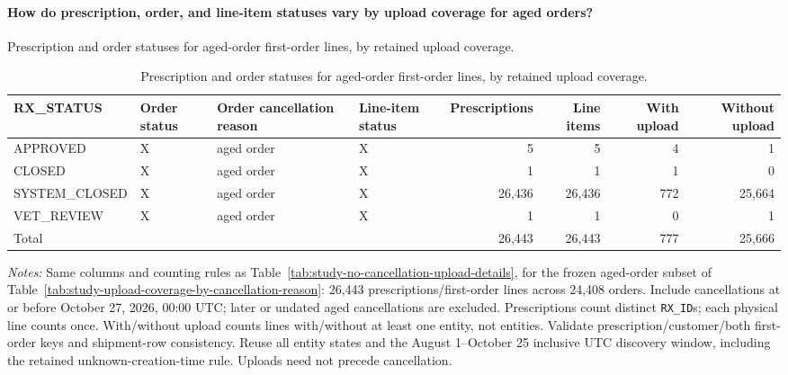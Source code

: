 \begin{landscape}
\paragraph{How do prescription, order, and line-item statuses vary by upload coverage for aged orders?}
Prescription and order statuses for aged-order first-order lines, by retained upload coverage.

\begin{table}[!htbp]
\centering
\caption{Prescription and order statuses for aged-order first-order lines, by retained upload coverage.}
\label{tab:study-aged-order-upload-coverage}
\small
\setlength{\tabcolsep}{6pt}
\begin{tabular}{llllrrrr}
\toprule
RX\_STATUS & Order status & Order cancellation reason & Line-item status & Prescriptions & Line items & With upload & Without upload \\
\midrule
\rowcolor{yellow!35}
APPROVED & X & aged order & X & 5 & 5 & 4 & 1 \\
\rowcolor{yellow!35}
CLOSED & X & aged order & X & 1 & 1 & 1 & 0 \\
\rowcolor{yellow!35}
SYSTEM\_CLOSED & X & aged order & X & 26,436 & 26,436 & 772 & 25,664 \\
\rowcolor{yellow!35}
VET\_REVIEW & X & aged order & X & 1 & 1 & 0 & 1 \\
\midrule
\multicolumn{4}{l}{Total} & 26,443 & 26,443 & 777 & 25,666 \\
\bottomrule
\end{tabular}
\begin{minipage}{\linewidth}
\footnotesize
\textit{Notes:} Same columns and counting rules as Table~\ref{tab:study-no-cancellation-upload-details},
for the frozen aged-order subset of Table~\ref{tab:study-upload-coverage-by-cancellation-reason}:
26,443 prescriptions/first-order lines across 24,408 orders. Include cancellations
at or before October 27, 2026, 00:00 UTC; later or undated aged cancellations are excluded.
Prescriptions count distinct \texttt{RX\_ID}s; each physical line counts once.
With/without upload counts lines with/without at least one entity, not entities.
Validate prescription/customer/both first-order keys and shipment-row consistency.
Reuse all entity states and the August 1--October 25 inclusive UTC discovery window,
including the retained unknown-creation-time rule. Uploads need not precede cancellation.
\end{minipage}
\end{table}
\end{landscape}

